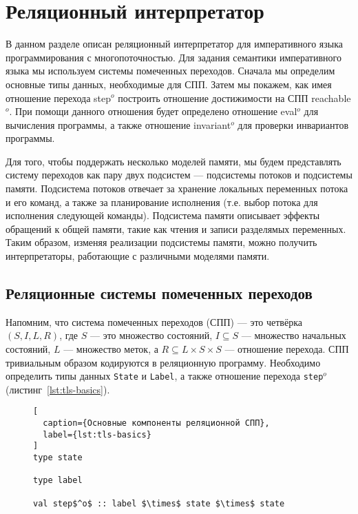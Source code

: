 \section{Реляционный интерпретатор}

В данном разделе описан реляционный интерпретатор 
для императивного языка программирования с многопоточностью. 
Для задания семантики императивного языка мы используем системы помеченных переходов. 
Сначала мы определим основные типы данных, необходимые для СПП.
Затем мы покажем, как имея отношение перехода step$^o$ 
построить отношение достижимости на СПП reachable$^o$.
При помощи данного отношения будет определено 
отношение eval$^o$ для вычисления программы,
а также отношение invariant$^o$ для проверки инвариантов программы.

Для того, чтобы поддержать несколько моделей памяти,
мы будем представлять систему переходов как 
пару двух подсистем --- подсистемы потоков и подсистемы памяти. 
Подсистема потоков отвечает за 
хранение локальных переменных потока и его команд,
а также за планирование исполнения
(т.е. выбор потока для исполнения следующей команды).
Подсистема памяти описывает эффекты обращений к общей памяти, 
такие как чтения и записи разделямых переменных.
Таким образом, изменяя реализации подсистемы памяти,
можно получить интерпретаторы, работающие с различными моделями памяти.

\subsection{Реляционные системы помеченных переходов}

Напомним, что система помеченных переходов (СПП) --- это 
четвёрка $(S, I, L, R)$, где $S$ --- это множество состояний, 
$I \subseteq S$ --- множество начальных состояний,
$L$ --- множество меток, а $R \subseteq L \times S \times S$ --- отношение перехода.
СПП тривиальным образом кодируются в реляционную программу.
Необходимо определить типы данных \texttt{State} и \texttt{Label},
а также отношение перехода \texttt{step$^o$} (листинг~\ref{lst:tls-basics}).

\begin{figure}[thb]
\begin{minipage}{\linewidth}
\begin{lstlisting}[
  caption={Основные компоненты реляционной СПП},
  label={lst:tls-basics}
]
type state

type label

val step$^o$ :: label $\times$ state $\times$ state
\end{lstlisting}
\end{minipage}
\end{figure}


